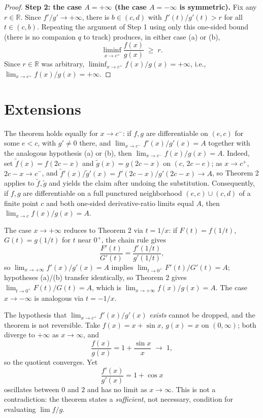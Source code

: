 \documentclass{essay}
\begin{document}
\begin{proof}
  \medskip
  \textbf{Step 2: the case $A=+\infty$ (the case $A=-\infty$ is symmetric).} Fix any $r\in\mathbb{R}$. Since $f'/g'\to+\infty$, there is $b\in(c,d)$ with $f'(t)/g'(t) > r$ for all $t\in(c,b)$. Repeating the argument of Step 1 using only this one-sided bound (there is no companion $q$ to track) produces, in either case (a) or (b),
  \[
    \liminf_{x\to c^+}\frac{f(x)}{g(x)} \;\ge\; r.
  \]
  Since $r\in\mathbb{R}$ was arbitrary, $\liminf_{x\to c^+} f(x)/g(x) = +\infty$, i.e., $\lim_{x\to c^+} f(x)/g(x) = +\infty$.
\end{proof}

\section{Extensions}

\begin{corollary}
  The theorem holds equally for $x\to c^-$: if $f,g$ are differentiable on $(e,c)$ for some $e<c$, with $g'\neq 0$ there, and $\lim_{x\to c^-} f'(x)/g'(x) = A$ together with the analogous hypothesis (a) or (b), then $\lim_{x\to c^-} f(x)/g(x) = A$. Indeed, set $\tilde f(x) = f(2c-x)$ and $\tilde g(x)=g(2c-x)$ on $(c,\,2c-e)$; as $x\to c^+$, $2c-x\to c^-$, and $\tilde f'(x)/\tilde g'(x) = f'(2c-x)/g'(2c-x) \to A$, so Theorem 2 applies to $\tilde f,\tilde g$ and yields the claim after undoing the substitution. Consequently, if $f,g$ are differentiable on a full punctured neighborhood $(e,c)\cup(c,d)$ of a finite point $c$ and both one-sided derivative-ratio limits equal $A$, then $\lim_{x\to c} f(x)/g(x) = A$.
\end{corollary}

\begin{corollary}
  The case $x\to+\infty$ reduces to Theorem 2 via $t=1/x$: if $F(t)=f(1/t)$, $G(t)=g(1/t)$ for $t$ near $0^+$, the chain rule gives
  \[
    \frac{F'(t)}{G'(t)} = \frac{f'(1/t)}{g'(1/t)},
  \]
  so $\lim_{x\to+\infty} f'(x)/g'(x) = A$ implies $\lim_{t\to 0^+} F'(t)/G'(t) = A$; hypotheses (a)/(b) transfer identically, so Theorem 2 gives $\lim_{t\to 0^+} F(t)/G(t) = A$, which is $\lim_{x\to+\infty} f(x)/g(x) = A$. The case $x\to-\infty$ is analogous via $t=-1/x$.
\end{corollary}

\begin{remark}
  The hypothesis that $\lim_{x\to c^+} f'(x)/g'(x)$ \emph{exists} cannot be dropped, and the theorem is not reversible. Take $f(x) = x+\sin x$, $g(x)=x$ on $(0,\infty)$; both diverge to $+\infty$ as $x\to\infty$, and
  \[
    \frac{f(x)}{g(x)} = 1+\frac{\sin x}{x} \;\longrightarrow\; 1,
  \]
  so the quotient converges. Yet
  \[
    \frac{f'(x)}{g'(x)} = 1+\cos x
  \]
  oscillates between $0$ and $2$ and has no limit as $x\to\infty$. This is not a contradiction: the theorem states a \emph{sufficient}, not necessary, condition for evaluating $\lim f/g$.
\end{remark}
\end{document}
